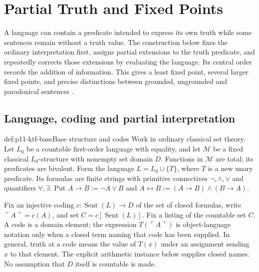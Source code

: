 \chapter{Partial Truth and Fixed Points}
\label{sec:p11-kripke-fixed-points}

A language can contain a predicate intended to express its own truth while
some sentences remain without a truth value. The construction below fixes
the ordinary interpretation first, assigns partial extensions to the truth
predicate, and repeatedly corrects those extensions by evaluating the
language. Its central order records the addition of information. This gives
a least fixed point, several larger fixed points, and precise distinctions
between grounded, ungrounded and paradoxical sentences
\cite[pp.~700--709]{Kripke1975}.

\section{Language, coding and partial interpretation}

\begin{hbconvention}{def:p11-ktf-base}{Base structure and codes}
Work in ordinary classical set theory. Let \(L_0\) be a countable first-order
language with equality, and let \(\mathcal M\) be a fixed classical
\(L_0\)-structure with nonempty set domain \(D\). Functions in
\(\mathcal M\) are total; its predicates are bivalent. Form the language
\(L=L_0\cup\{T\}\), where \(T\) is a new unary predicate. Its formulas
are finite strings with primitive connectives \(\neg,\land,\lor\) and
quantifiers \(\forall,\exists\). Put
\(A\to B:=\neg A\lor B\) and
\(A\leftrightarrow B:=(A\to B)\land(B\to A)\).

Fix an injective coding \(c:\operatorname{Sent}(L)\to D\) of the set of
closed formulas, write \(\ulcorner A\urcorner=c(A)\), and set
\(C=c[\operatorname{Sent}(L)]\). Fix a listing of the countable set \(C\).
A code is a domain element; the expression
\(T(\ulcorner A\urcorner)\) is object-language notation only when a
closed term naming that code has been supplied. In general, truth at a code
means the value of \(T(x)\) under an assignment sending \(x\) to that
element. The explicit arithmetic instance below supplies closed names.
No assumption that \(D\) itself is countable is made.
\end{hbconvention}

